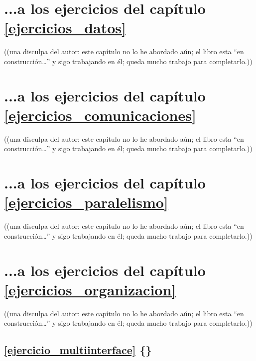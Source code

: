 \documentclass[spanish,12pt,a4paper,final,oneside]{book}
\begin{document}
	
\section{...a los ejercicios del capítulo \ref{ejercicios_datos}}

\begin{footnotesize}((una disculpa del autor: este capítulo no lo he abordado aún; el libro esta ``en construcción\ldots'' y sigo trabajando en él; queda mucho trabajo para completarlo.))\end{footnotesize}




\section{...a los ejercicios del capítulo \ref{ejercicios_comunicaciones}}

\begin{footnotesize}((una disculpa del autor: este capítulo no lo he abordado aún; el libro esta ``en construcción\ldots'' y sigo trabajando en él; queda mucho trabajo para completarlo.))\end{footnotesize}




\section{...a los ejercicios del capítulo \ref{ejercicios_paralelismo}}

\begin{footnotesize}((una disculpa del autor: este capítulo no lo he abordado aún; el libro esta ``en construcción\ldots'' y sigo trabajando en él; queda mucho trabajo para completarlo.))\end{footnotesize}



\section{...a los ejercicios del capítulo \ref{ejercicios_organizacion}}

\begin{footnotesize}((una disculpa del autor: este capítulo no lo he abordado aún; el libro esta ``en construcción\ldots'' y sigo trabajando en él; queda mucho trabajo para completarlo.))\end{footnotesize}

\vspace{1cm}
\subsection*{\ref{ejercicio_multiinterface} \{\}}
\end{document}
